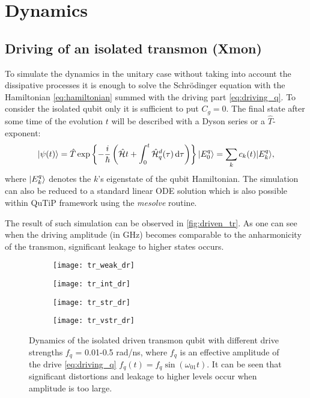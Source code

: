 \documentclass[12pt, twoside]{report}
\newcommand{\diff}{\,\mathrm{d}}
\DeclarePairedDelimiter\ket{\lvert}{\rangle}
\newcommand{\rbrkt}[1]{\left( #1 \right)}
\numberwithin{equation}{section}
\begin{document}
\section{Dynamics}

\subsection{Driving of an isolated transmon (Xmon)}

To simulate the dynamics in the unitary case without taking into account the dissipative processes it is enough to solve the Schrödinger equation with the Hamiltonian \eqref{eq:hamiltonian} summed with the driving part \eqref{eq:driving_q}. To consider the isolated qubit only it is sufficient to put $C_g = 0$. The final state after some time of the evolution $t$ will be described with a Dyson series or a $\hat T$-exponent:
\begin{equation}
\ket{\psi (t)} = \hat T \exp\left\{-\frac{i}{\hbar} \rbrkt{\mathcal{\hat H}t + \int_0^t \mathcal{\hat H}_q^d(\tau) \diff\tau}\right\} \ket{E_0^q}= \sum_k c_k(t) \ket{E^q_k},
\end{equation} 
where $\ket{E_k^q}$ denotes the $k$'s eigenstate of the qubit Hamiltonian. The simulation can also be reduced to a standard linear ODE solution which is also possible within QuTiP framework using the \textit{mesolve} routine.

The result of such simulation can be observed in \autoref{fig:driven_tr}. As one can see when the driving amplitude (in GHz) becomes comparable to the anharmonicity of the transmon, significant leakage to higher states occurs.

\begin{figure}[h!]
\centering
\begin{subfigure}[t]{0.45\textwidth}
\texttt{[image: tr\_weak\_dr]}
\end{subfigure}
\begin{subfigure}[t]{0.45\textwidth}
\texttt{[image: tr\_int\_dr]}
\end{subfigure}

\begin{subfigure}[t]{0.45\textwidth}
\texttt{[image: tr\_str\_dr]}
\end{subfigure}
\begin{subfigure}[t]{0.45\textwidth}
\texttt{[image: tr\_vstr\_dr]}
\end{subfigure}
\caption{Dynamics of the isolated driven transmon qubit with different drive strengths $f_q$ = 0.01-0.5 rad/ns, where $f_q$ is an effective amplitude of the drive \eqref{eq:driving_q} $f_q (t) = f_q \sin(\omega_{01} t)$. It can be seen that significant distortions and leakage to higher levels occur when amplitude is too large.}
\label{fig:driven_tr}
\end{figure}
\end{document}
